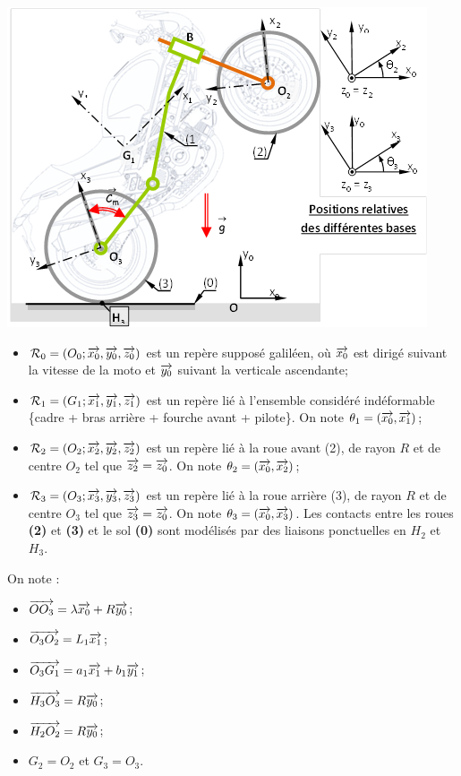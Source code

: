 \documentclass[10pt,fleqn]{article} %
\begin{document}
\begin{multicols}{2}
\begin{center}
\includegraphics[width=\linewidth]{images/fig_01}
\end{center}
\begin{itemize}
\item $\mathcal{R}_0=\left(O_0;\overrightarrow{x_0},\overrightarrow{y_0},\overrightarrow{z_0} \right)$ est un repère supposé galiléen, où $\overrightarrow{x_0}$ est dirigé suivant la vitesse de la moto et $\overrightarrow{y_0}$ suivant la verticale ascendante;
\item $\mathcal{R}_1=\left(G_1;\overrightarrow{x_1},\overrightarrow{y_1},\overrightarrow{z_1} \right)$ est un repère lié à l'ensemble considéré indéformable \{cadre + bras arrière + fourche avant + pilote\}. On note $\theta_1=\left(\overrightarrow{x_0},\overrightarrow{x_1}\right)$;
\item $\mathcal{R}_2=\left(O_2;\overrightarrow{x_2},\overrightarrow{y_2},\overrightarrow{z_2} \right)$ est un repère lié à la roue avant (2), de rayon $R$ et de centre $O_2$ tel que $\overrightarrow{z_2}=\overrightarrow{z_0}$. On note $\theta_2=\left(\overrightarrow{x_0},\overrightarrow{x_2}\right)$;
\item $\mathcal{R}_3=\left(O_3;\overrightarrow{x_3},\overrightarrow{y_3},\overrightarrow{z_3} \right)$ est un repère lié à la roue arrière (3), de rayon $R$ et de centre $O_3$ tel que $\overrightarrow{z_3}=\overrightarrow{z_0}$. On note $\theta_3=\left(\overrightarrow{x_0},\overrightarrow{x_3}\right)$. Les contacts entre les roues \textbf{(2)} et \textbf{(3)} et le sol \textbf{(0)} sont modélisés par des liaisons ponctuelles en $H_2$ et $H_3$.
\end{itemize}

On note :
\begin{itemize}
\item $\overrightarrow{OO_3} = \lambda \overrightarrow{x_0}+R\overrightarrow{y_0}$;
\item $\overrightarrow{O_3O_2} = L_1\overrightarrow{x_1}$;
\item $\overrightarrow{O_3G_1} = a_1\overrightarrow{x_1}+b_1\overrightarrow{y_1}$;
\item $\overrightarrow{H_3O_3} = R \overrightarrow{y_0}$;
\item $\overrightarrow{H_2O_2} = R \overrightarrow{y_0}$;
\item $G_2 = O_2$ et $G_3 = O_3$.
\end{itemize}


\end{multicols}
\end{document}
